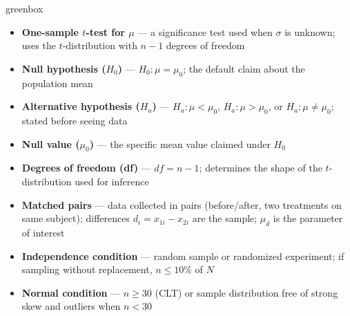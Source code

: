 \documentclass[10pt]{article}
\begin{document}
\begin{skillbox}{greenbox}
\begin{minipage}[t]{0.48\linewidth}
    \begin{itemize}
        \item \textbf{One-sample $t$-test for $\mu$} --- a significance test used when
              $\sigma$ is unknown; uses the $t$-distribution with $n-1$ degrees of freedom
        \item \textbf{Null hypothesis ($H_0$)} --- $H_0: \mu = \mu_0$; the default claim
              about the population mean
        \item \textbf{Alternative hypothesis ($H_a$)} --- $H_a: \mu < \mu_0$,
              $H_a: \mu > \mu_0$, or $H_a: \mu \ne \mu_0$; stated before seeing data
        \item \textbf{Null value ($\mu_0$)} --- the specific mean value claimed under $H_0$
    \end{itemize}
\end{minipage}
\hfill
\begin{minipage}[t]{0.48\linewidth}
    \begin{itemize}
        \item \textbf{Degrees of freedom (df)} --- $df = n - 1$; determines the shape
              of the $t$-distribution used for inference
        \item \textbf{Matched pairs} --- data collected in pairs (before/after, two
              treatments on same subject); differences $d_i = x_{1i} - x_{2i}$ are the
              sample; $\mu_d$ is the parameter of interest
        \item \textbf{Independence condition} --- random sample or randomized experiment;
              if sampling without replacement, $n \le 10\%$ of $N$
        \item \textbf{Normal condition} --- $n \ge 30$ (CLT) or sample distribution free
              of strong skew and outliers when $n < 30$
    \end{itemize}
\end{minipage}
\end{skillbox}
\end{document}
